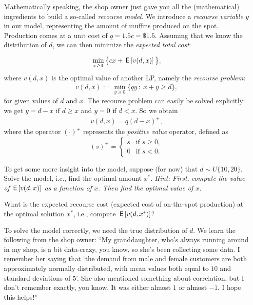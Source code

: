 \documentclass[assignments]{subfiles}
\begin{document}
Mathematically speaking, the shop owner just gave you all the (mathematical) ingredients to build a so-called \textit{recourse model}. We introduce a \textit{recourse variable} $y$ in our model, representing the amount of muffins produced on the spot. Production comes at a unit cost of $q = 1.5 c = \$ 1.5$. Assuming that we know the distribution of $d$, we can then minimize the \textit{expected total cost}:

\begin{align}
    \min_{x \geq 0} \big\{ cx + \,\mathsf{E}\left[v(d,x)\right] \big\},
\end{align}
where $v(d,x)$ is the optimal value of another LP, namely the \textit{recourse problem}:
\begin{align}
    v(d,x) := \min_{y \geq 0} \{ qy \ : \ x + y \geq d \},
\end{align}
for given values of $d$ and $x$. The recourse problem can easily be solved explicitly: we get $y=d-x$ if $d \geq x$ and $y=0$ if $d < x$. So we obtain
\begin{align}
    v(d,x) = q (d - x)^+,
\end{align}
where the operator $(\cdot)^+$ represents the \textit{positive value} operator, defined as
\begin{equation}
    (s)^+ = \begin{cases}
    s &\text{if } s \geq 0,\\
    0 &\text{if } s < 0.
    \end{cases}
\end{equation}

\begin{exercise}
To get some more insight into the model, suppose (for now) that $d \sim U\{10, 20\}$.
    Solve the model, i.e., find the optimal amount $x^*$.
    \textit{Hint: First, compute the value of $\,\mathsf{E}\left[v(d,x)\right]$ as a function of $x$.
      Then find the optimal value of $x$.}
\end{exercise}

\begin{exercise}
 What is the expected recourse cost (expected cost of on-the-spot production) at the optimal solution $x^*$, i.e., compute $\,\mathsf{E}\left[v(d,x^*)\right]$?
\end{exercise}

To solve the model correctly, we need the true distribution of $d$. We learn the following from the shop owner: ``My granddaughter, who's always running around in my shop, is a bit data-crazy, you know, so she's been collecting some data. I remember her saying that `the demand from male and female customers are both approximately normally distributed, with mean values both equal to $10$ and standard deviations of $5$'. She also mentioned something about correlation, but I don't remember exactly, you know. It was either almost $1$ or almost $-1$. I hope this helps!''
\end{document}

